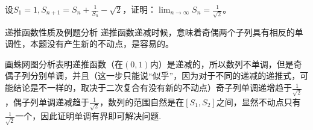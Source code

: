 \documentclass[lang=cn,newtx,10pt,scheme=chinese]{elegantbook}
\begin{document}
\begin{example}
设\(S_1 = 1,S_{n + 1}=S_n+\frac{1}{S_n}-\sqrt{2}\)，证明：\(\lim_{n\rightarrow\infty}S_n=\frac{1}{\sqrt{2}}\)。
\end{example}
\begin{note}
递推函数性质及例题分析
递推函数递减时候，意味着奇偶两个子列具有相反的单调性，本题没有产生新的不动点，是容易的。

画蛛网图分析表明递推函数（在\((0,1)\)内）是递减的，所以数列不单调，但是奇偶子列分别单调，并且（这一步只能说“似乎”，因为对于不同的递减的递推式，可能结论是不一样的，取决于二次复合有没有新的不动点）奇子列单调递增趋于\(\frac{1}{\sqrt{2}}\)，偶子列单调递减趋于\(\frac{1}{\sqrt{2}}\)，数列的范围自然是在\([S_1,S_2]\)之间，显然不动点只有\(\frac{1}{\sqrt{2}}\)一个，因此证明单调有界即可解决问题.
\end{note}
\end{document}
